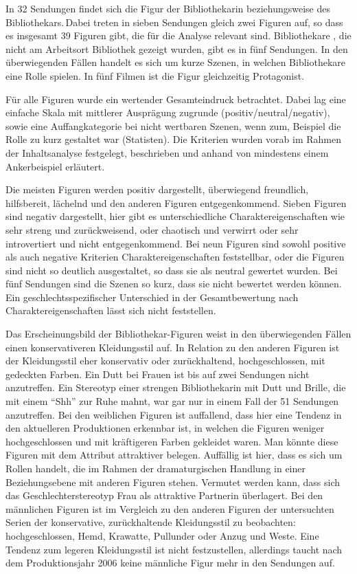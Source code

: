 In 32 Sendungen findet sich die Figur der Bibliothekarin beziehungsweise
des Bibliothekars.\,Dabei treten in sieben Sendungen gleich zwei Figuren
auf, so dass es insgesamt 39 Figuren gibt, die für die Analyse relevant
sind. Bibliothekare , die nicht am Arbeitsort Bibliothek gezeigt wurden,
gibt es in fünf Sendungen. In den überwiegenden Fällen handelt es sich
um kurze Szenen, in welchen Bibliothekare eine Rolle spielen. In fünf
Filmen ist die Figur gleichzeitig Protagonist.

Für alle Figuren wurde ein wertender Gesamteindruck betrachtet. Dabei
lag eine einfache Skala mit mittlerer Ausprägung zugrunde
(positiv/neutral/negativ), sowie eine Auffangkategorie bei nicht
wertbaren Szenen, wenn zum, Beispiel die Rolle zu kurz gestaltet war
(Statisten). Die Kriterien wurden vorab im Rahmen der Inhaltsanalyse
festgelegt, beschrieben und anhand von mindestens einem Ankerbeispiel
erläutert.

Die meisten Figuren werden positiv dargestellt, überwiegend freundlich,
hilfsbereit, lächelnd und den anderen Figuren entgegenkommend. Sieben
Figuren sind negativ dargestellt, hier gibt es unterschiedliche
Charaktereigenschaften wie sehr streng und zurückweisend, oder chaotisch
und verwirrt oder sehr introvertiert und nicht entgegenkommend. Bei neun
Figuren sind sowohl positive als auch negative Kriterien
Charaktereigenschaften feststellbar, oder die Figuren sind nicht so
deutlich ausgestaltet, so dass sie als neutral gewertet wurden. Bei fünf
Sendungen sind die Szenen so kurz, dass sie nicht bewertet werden
können. Ein geschlechtsspezifischer Unterschied in der Gesamtbewertung
nach Charaktereigenschaften lässt sich nicht feststellen.

Das Erscheinungsbild der Bibliothekar-Figuren weist in den überwiegenden
Fällen einen konservativeren Kleidungsstil auf. In Relation zu den
anderen Figuren ist der Kleidungsstil eher konservativ oder
zurückhaltend, hochgeschlossen, mit gedeckten Farben. Ein Dutt bei
Frauen ist bis auf zwei Sendungen nicht anzutreffen. Ein Stereotyp einer
strengen Bibliothekarin mit Dutt und Brille, die mit einem \enquote{Shh}
zur Ruhe mahnt, war gar nur in einem Fall der 51 Sendungen anzutreffen.
Bei den weiblichen Figuren ist auffallend, dass hier eine Tendenz in den
aktuelleren Produktionen erkennbar ist, in welchen die Figuren weniger
hochgeschlossen und mit kräftigeren Farben gekleidet waren. Man könnte
diese Figuren mit dem Attribut attraktiver belegen. Auffällig
ist hier, dass es sich um Rollen handelt, die im Rahmen der
dramaturgischen Handlung in einer Beziehungsebene mit anderen Figuren
stehen. Vermutet werden kann, dass sich das
Geschlechterstereotyp Frau als attraktive Partnerin
überlagert. Bei den männlichen Figuren ist im Vergleich zu den anderen
Figuren der untersuchten Serien der konservative, zurückhaltende
Kleidungsstil zu beobachten: hochgeschlossen, Hemd, Krawatte, Pullunder
oder Anzug und Weste. Eine Tendenz zum legeren Kleidungsstil ist nicht
festzustellen, allerdings taucht nach dem Produktionsjahr 2006 keine
männliche Figur mehr in den Sendungen auf.

